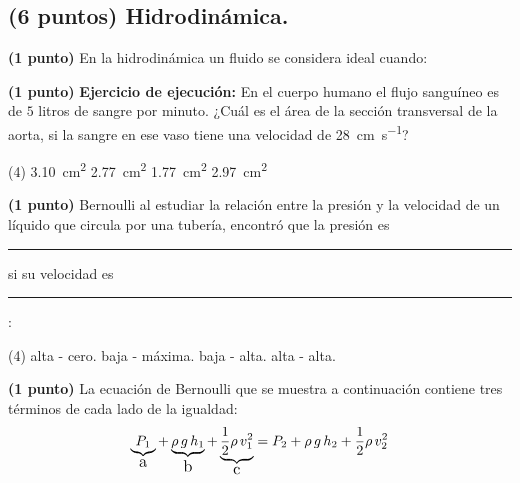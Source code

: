 \documentclass[12pt, letter]{exam}
\begin{document}


\newpage

\begin{questions}
    
    \section{(6 puntos) Hidrodinámica.}

    \question \textbf{(1 punto)} En la hidrodinámica un fluido se considera ideal cuando:
    \question \textbf{(1 punto)} \label{Problema_01} \textbf{Ejercicio de ejecución: } En el cuerpo humano el flujo sanguíneo es de $5$ litros de sangre por minuto. ¿Cuál es el área de la sección transversal de la aorta, si la sangre en ese vaso tiene una velocidad de \SI{28}{\centi\meter\per\second}?
    \begin{tasks}(4)
        \task \SI{3.10}{\square\centi\meter}
        \task \SI{2.77}{\square\centi\meter}
        \task \SI{1.77}{\square\centi\meter}
        \task \SI{2.97}{\square\centi\meter}
    \end{tasks}
    \question \textbf{(1 punto)} Bernoulli al estudiar la relación entre la presión y la velocidad de un líquido que circula por una tubería, encontró que la presión es \rule{2cm}{0.1mm} si su velocidad es \rule{2cm}{0.1mm}:
    \begin{tasks}(4)
        \task alta - cero.
        \task baja - máxima.
        \task baja - alta.
        \task alta - alta.
    \end{tasks}
    \question \textbf{(1 punto)} La ecuación de Bernoulli que se muestra a continuación contiene tres términos de cada lado de la igualdad:
    \begin{align*}
    \underbrace{P_{1}}_{\text{\large{a}}} + \underbrace{\rho \, g \, h_{1}}_{\text{\large{b}}} + \underbrace{\dfrac{1}{2} \rho \, v_{1}^{2}}_{\text{\large{c}}} = P_{2} + \rho \, g \, h_{2} + \dfrac{1}{2} \rho \, v_{2}^{2}
    \end{align*}
        

\end{questions}
\end{document}
